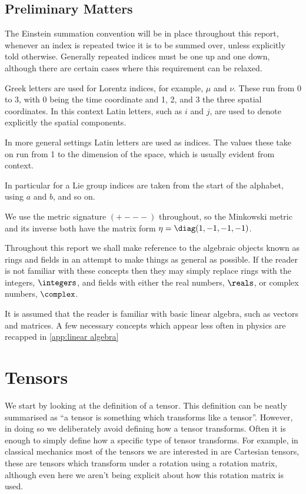 \documentclass[fleqn]{NotesClass}
\newcommand{\minkowskiMetric}{\eta}
\begin{document}
    \section{Preliminary Matters}
    The Einstein summation convention will be in place throughout this report, whenever an index is repeated twice it is to be summed over, unless explicitly told otherwise.
    Generally repeated indices must be one up and one down, although there are certain cases where this requirement can be relaxed.
    
    Greek letters are used for Lorentz indices, for example, \(\mu\) and \(\nu\).
    These run from 0 to 3, with 0 being the time coordinate and 1, 2, and 3 the three spatial coordinates.
    In this context Latin letters, such as \(i\) and \(j\), are used to denote explicitly the spatial components.
    
    In more general settings Latin letters are used as indices.
    The values these take on run from 1 to the dimension of the space, which is usually evident from context.
    
    In particular for a Lie group indices are taken from the start of the alphabet, using \(a\) and \(b\), and so on.
    
    We use the metric signature \(({+}{-}{-}{-})\) throughout, so the Minkowski metric and its inverse both have the matrix form \(\minkowskiMetric = \diag(1, -1, -1, -1)\).
    
    Throughout this report we shall make reference to the algebraic objects known as rings and fields in an attempt to make things as general as possible.
    If the reader is not familiar with these concepts then they may simply replace rings with the integers, \(\integers\), and fields with either the real numbers, \(\reals\), or complex numbers, \(\complex\).
    
    It is assumed that the reader is familiar with basic linear algebra, such as vectors and matrices.
    A few necessary concepts which appear less often in physics are recapped in \cref{app:linear algebra}
    
    \chapter{Tensors}
    We start by looking at the definition of a tensor.
    This definition can be neatly summarised as \enquote{a tensor is something which transforms like a tensor}.
    However, in doing so we deliberately avoid defining how a tensor transforms.
    Often it is enough to simply define how a specific type of tensor transforms.
    For example, in classical mechanics most of the tensors we are interested in are Cartesian tensors, these are tensors which transform under a rotation using a rotation matrix, although even here we aren't being explicit about how this rotation matrix is used.
    
\end{document}
